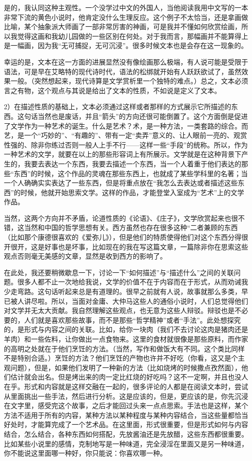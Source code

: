 \documentclass[11pt]{article}
\begin{document}
是的，我认同这种主观性。一个没学过中文的外国人，当他阅读我用中文写的一本非常下流的黄色小说时，他肯定没什么生理反应。这个例子不太恰当，还是拿画做比喻，某个抽象派大师画了一部非常厉害的神画，可是我并不懂如何欣赏绘画，所以我觉得这画和我幼儿园做的一些区别在何处。对于我而言，那幅画并不能算得上是一幅画，因为我“无可捕捉，无可沉浸”。很多时候文本也是会存在这一现象的。

幸运的是，文本在这一方面的进展显然没有像绘画那么极端，有人说可能是受限于语法，可是早在艾略特的现代诗时代，语法的松绑就开始有人跃跃欲试了，虽然效果一般。（突然想起来，现代诗算是文学赏析里一个独特的难点。）总之，文本必须言之有物，这个观点与其说是给出了文本的性质，不如说是定义了文本。

2）在描述性质的基础上，文本必须通过这样或者那样的方式展示它所描述的东西。这句话当然也是废话，并且“箭头”的方向还很可能倒置了。这个方面倒是促进了文学作为一种艺术的诞生。什么是艺术？术，是一种方法，一类套路的综合。而艺，是一个“巧妙的”、“有趣的”、带有一定“卖弄”意义的、让人眼前一亮的、观赏性强的、除非你练过否则一般人上手不行——这样一些“手段”的统称。所以，作为一种艺术的文学，就要在以上的那些形容词上有所展示。文学就是在这种背景下产生的，我要去表达一个东西，我要去描述一个东西，当一个人着重于他们表达的那些“东西”的时候，这个作品的灵魂在那些东西上，也就成了某些学科里的名著；当一个人确确实实表达了一些东西，但是将重点放在“我怎么去表达或者描述这些东西”的时候，他就开始思索文学。这样的作品，才能登堂入室成为“艺术”上的文学作品。

当然，这两个方向并不矛盾，论道性质的《论语》、《庄子》，文学欣赏起来也很不错，这当然和中国的哲学思想有关。西方虽然也存在很多这种“二者兼顾的东西（比如那个康德很喜欢的《爱弥儿》），但是他们的特质使得他们对这个东西分得很开很开，这是好事也是坏事，比如现在的我在写这篇文章，一篇除非你在思索这些观点否则毫无美感的文章，显然是收到西方的影响了。

在此处，我还要稍微歇息一下，讨论一下“如何描述”与“描述什么”之间的关联问题。很多人都不止一次地给我说，文学的价值不在于内容而在于形式，从而劝诫我少走弯路。这句话听起来总是有道理的。很早之前就有人说，故事就那么多类，早已被人讲尽啦。所以，当面对金庸、大仲马这些人的通俗小说时，人们总觉得他们对文学并无太大贡献。我自然理解这些观点，也无意为这些人辩驳。辩驳也是不必要的，人们就是喜欢那些故事，而不是那些“哲学精神”或者“手法”。此处想探究的，是形式与内容之间的关联。比如，给你一块肉（我们不去讨论这肉是猪肉还是羊肉）和一些佐料，让你做出一点食物来。这里的食材就很像是那些原料，而作家的高明之处就在于他们烹饪的方法。（当然，写作和做饭大有不同。这个类比同样不是特别合适。）烹饪的方法？他们烹饪的产物也许并不好吃（你看，这又是个主观问题），但是，如果他们发明了一种新的方法（比如烧烤的时候撒点孜然面），他们估计就会出名。但是烤出来的肉一定比红烧的好吃吗？这不一定啊，并且也没人在乎。形式和内容就是这样交融在一起的，很多评论的人都是在阅读文本时，尝试从里面挑出一些手法，然后进行分析。这是应该的，但是，更应该的是，你先沉浸在文字里，感受完这个故事，之后才能回过头来一点点思索。手法也是这样，某个方法不适用于所有的内容，某种方法以某种程度与某种内容结合，当这些量都恰当好处时，才能算完成了一个艺术品。在这里面，形式很重要，但是形式如何与内容结合，怎么结合，各种东西如何搭配，先放酱油还是先放醋，这些东西都很重要。比如某些小说里的感情，克制地写是一种味道，完全浸淫在里面又是另一种味道，你不能说这里面哪一种好，你只能说：你喜欢哪一种。
\end{document}
